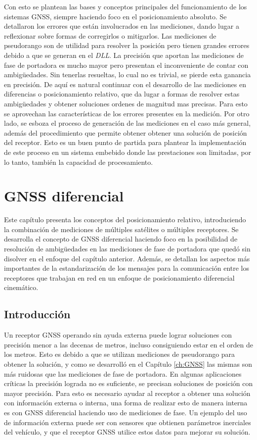 \documentclass[a4paper,12pt,oneside,onecolumn,final,openright]{book}%
\begin{document}
	Con esto se plantean las bases y conceptos principales del funcionamiento de los sistemas GNSS, siempre haciendo foco en el posicionamiento absoluto. Se detallaron los errores que están involucrados en las mediciones, dando lugar a reflexionar sobre formas de corregirlos o mitigarlos. Las mediciones de pseudorango son de utilidad para resolver la posición pero tienen grandes errores debido a que se generan en el \textit{DLL}. La precisión que aportan las mediciones de fase de portadora es mucho mayor pero presentan el inconveniente de contar con ambigüedades. Sin tenerlas resueltas, lo cual no es trivial, se pierde esta ganancia en precisión. De aquí es natural continuar con el desarrollo de las mediciones en diferencias o posicionamiento relativo, que da lugar a formas de resolver estas ambigüedades y obtener soluciones ordenes de magnitud mas precisas. Para esto se aprovechan las características de los errores presentes en la medición. Por otro lado, se esboza el proceso de generación de las mediciones en el caso más general, además del procedimiento que permite obtener obtener una solución de posición del receptor. Esto es un buen punto de partida para plantear la implementación de este proceso en un sistema embebido donde las prestaciones son limitadas, por lo tanto, también la capacidad de procesamiento.

\chapter{GNSS diferencial}\label{ch:DGNSS}
	Este capítulo presenta los conceptos del posicionamiento relativo, introduciendo la combinación de mediciones de múltiples satélites o múltiples receptores. Se desarrolla el concepto de GNSS diferencial haciendo foco en la posibilidad de resolución de ambigüedades en las mediciones de fase de portadora que quedó sin disolver en el enfoque del capítulo anterior. Además, se detallan los aspectos más importantes de la estandarización de los mensajes para la comunicación entre los receptores que trabajan en red en un enfoque de posicionamiento diferencial cinemático.
\section{Introducción}
	Un receptor GNSS operando sin ayuda externa puede lograr soluciones con precisión menor a las decenas de metros, incluso consiguiendo estar en el orden de los metros. Esto es debido a que se utilizan mediciones de pseudorango para obtener la solución, y como se desarrolló en el Capítulo \ref{ch:GNSS} las mismas son más ruidosas que las mediciones de fase de portadora. En algunas aplicaciones críticas la precisión lograda no es suficiente, se precisan soluciones de posición con mayor precisión.  Para esto es necesario ayudar al receptor a obtener una solución con información externa o interna, una forma de realizar esto de manera interna es con GNSS diferencial haciendo uso de mediciones de fase. Un ejemplo del uso de información externa puede ser con sensores que obtienen parámetros inerciales del vehículo, y que el receptor GNSS utilice estos datos para mejorar su solución.
	
\end{document}
